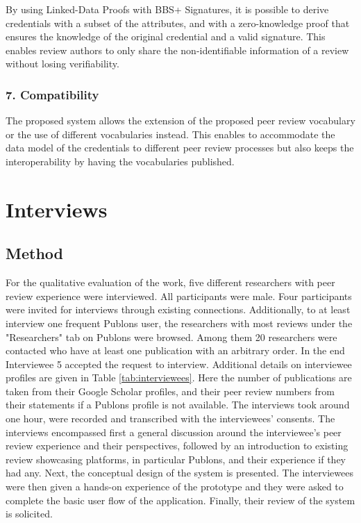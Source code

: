 By using Linked-Data Proofs with BBS+ Signatures, it is possible to derive credentials with a subset of the attributes, and with a zero-knowledge proof that ensures the knowledge of the original credential and a valid signature. This enables review authors to only share the non-identifiable information of a review without losing verifiability.

\subsubsection{7. Compatibility}

The proposed system allows the extension of the proposed peer review vocabulary or the use of different vocabularies instead. This enables to accommodate the data model of the credentials to different peer review processes but also keeps the interoperability by having the vocabularies published. 

\section{Interviews}

\subsection{Method}

For the qualitative evaluation of the work, five different researchers with peer review experience were interviewed. All participants were male. Four participants were invited for interviews through existing connections. Additionally, to at least interview one frequent Publons user, the researchers with most reviews under the "Researchers" tab on Publons were browsed. Among them 20 researchers were contacted who have at least one publication with an arbitrary order. In the end Interviewee 5 accepted the request to interview. Additional details on interviewee profiles are given in Table \ref{tab:interviewees}. Here the number of publications are taken from their Google Scholar profiles, and their peer review numbers from their statements if a Publons profile is not available. The interviews took around one hour, were recorded and transcribed with the interviewees' consents. The interviews encompassed first a general discussion around the interviewee's peer review experience and their perspectives, followed by an introduction to existing review showcasing platforms, in particular Publons, and their experience if they had any. Next, the conceptual design of the system is presented. The interviewees were then given a hands-on experience of the prototype and they were asked to complete the basic user flow of the application. Finally, their review of the system is solicited. 

